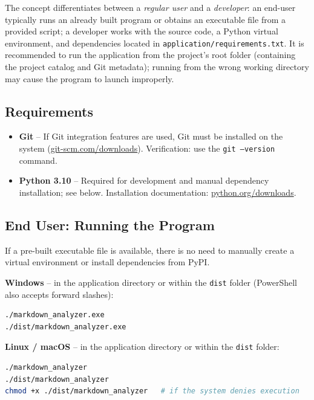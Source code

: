 \documentclass[12pt, a4paper]{article}
\begin{document}
The concept differentiates between a \emph{regular user} and a \emph{developer}: an end-user typically 
runs an already built program or obtains an executable file from a provided script; a developer works 
with the source code, a Python virtual environment, and dependencies located in \texttt{application/requirements.txt}. 
It is recommended to run the application from the project's root folder (containing the project catalog and Git metadata); 
running from the wrong working directory may cause the program to launch improperly.

\subsection{Requirements}

\begin{itemize}
    \item \textbf{Git} -- If Git integration features are used, Git must be installed on the system 
    (\href{https://git-scm.com/downloads}{git-scm.com/downloads}). Verification: use the \texttt{git --version} command.
    \item \textbf{Python 3.10} -- Required for development and manual dependency installation; see below. 
    Installation documentation: \href{https://www.python.org/downloads/}{python.org/downloads}.
\end{itemize}

\subsection{End User: Running the Program}

If a pre-built executable file is available, there is no need to manually create a virtual 
environment or install dependencies from PyPI.

\textbf{Windows} -- in the application directory or within the \texttt{dist} folder (PowerShell also accepts forward slashes):

\begin{lstlisting}[basicstyle=\ttfamily\small]
./markdown_analyzer.exe
./dist/markdown_analyzer.exe
\end{lstlisting}

\textbf{Linux / macOS} -- in the application directory or within the \texttt{dist} folder:

\begin{lstlisting}[language=bash, basicstyle=\ttfamily\small]
./markdown_analyzer
./dist/markdown_analyzer
chmod +x ./dist/markdown_analyzer   # if the system denies execution
\end{lstlisting}
\end{document}
